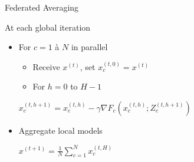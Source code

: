 \documentclass[aspectratio=169,12pt]{beamer}
\begin{document}
\begin{frame}[t]{Federated Averaging ~~~  ~~}  
    
    \vspace{1em}

  \begin{minipage}{0.5\linewidth}

  \footnotesize
  At each global iteration

    \begin{itemize}[leftmargin=*,itemsep=0em]
  \footnotesize
    \item For $c=1$ à $N$ in parallel

\vspace{-0.2em}
    
    
\begin{itemize}[leftmargin=*,itemsep=0em]
\item Receive $x^{(t)}$, set $x^{(t,0)}_c = x^{(t)}$
    
        \item For $h=0$ to $H-1$
    \end{itemize}

\vspace{-0.6em}
\begin{center}
            \hspace{-1em}$x^{(t,h+1)}_c = x^{(t,h)}_c - \gamma \nabla F_c( x^{(t,h)}_c ; Z_c^{(t,h+1)})$
        \end{center}
      
  \item Aggregate local models 
        
        
\vspace{-0.6em}
\begin{center}
            \hspace{-1em}$x^{(t+1)} = \frac{1}{N} \sum_{c=1}^N x_c^{(t,H)}$
        \end{center}
      
    \end{itemize}
      

\end{minipage}
\end{frame}
\end{document}
